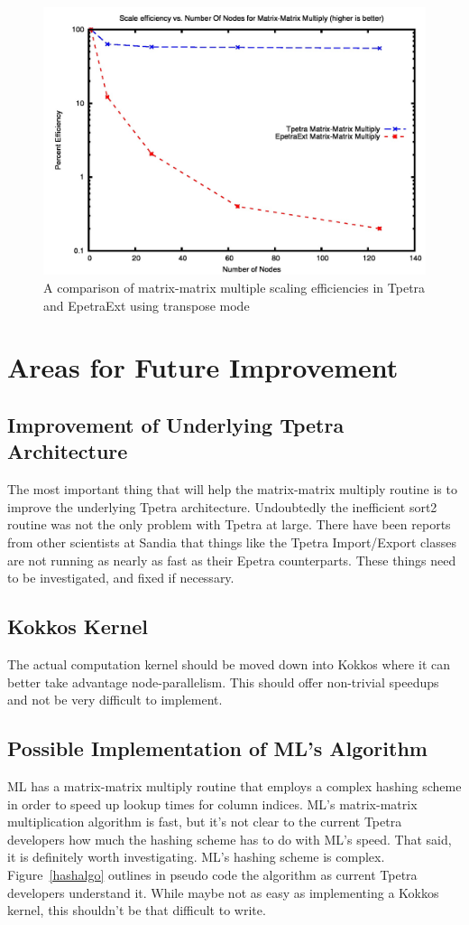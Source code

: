 \documentclass{article}
\begin{document}
\begin{figure}
\includegraphics[scale=.4]{atranseff.jpg}
\caption[Efficiency Comparison]{A comparison of matrix-matrix multiple scaling efficiencies in Tpetra and EpetraExt using transpose mode}
\label{transeff}
\end{figure}

\section{Areas for Future Improvement}
\subsection{Improvement of Underlying Tpetra Architecture}
The most important thing that will help the matrix-matrix multiply routine is to improve the underlying Tpetra architecture. 
Undoubtedly the inefficient sort2 routine was not the only problem with Tpetra at large. There have been reports from other 
scientists at Sandia that things like the Tpetra Import/Export classes are not running as nearly as fast as their Epetra 
counterparts. These things need to be investigated, and fixed if necessary.

\subsection{Kokkos Kernel}
The actual computation kernel should be moved down into Kokkos where it can better take advantage node-parallelism. 
This should offer non-trivial speedups and not be very difficult to implement.

\subsection{Possible Implementation of ML's Algorithm}
ML has a matrix-matrix multiply routine that employs a complex hashing scheme in order to speed up lookup times for 
column indices. ML's matrix-matrix multiplication algorithm is fast, but it's not clear to the current Tpetra developers 
how much the hashing scheme has to do with ML's speed. That said, it is definitely worth investigating. ML's hashing scheme 
is complex. Figure~\ref{hashalgo} outlines in pseudo code the algorithm as current Tpetra developers 
understand it. While maybe not as easy as implementing a Kokkos kernel, this shouldn't be that difficult to write.
\end{document}
